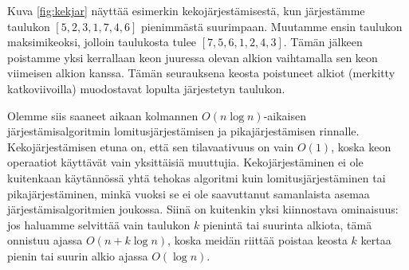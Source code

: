 Kuva \ref{fig:kekjar} näyttää esimerkin kekojärjestämisestä,
kun järjestämme taulukon $[5,2,3,1,7,4,6]$
pienimmästä suurimpaan.
Muutamme ensin taulukon maksimikeoksi,
jolloin taulukosta tulee $[7,5,6,1,2,4,3]$.
Tämän jälkeen poistamme yksi kerrallaan
keon juuressa olevan alkion vaihtamalla sen
keon viimeisen alkion kanssa.
Tämän seurauksena keosta poistuneet alkiot
(merkitty katkoviivoilla) muodostavat lopulta järjestetyn taulukon.

Olemme siis saaneet aikaan kolmannen $O(n \log n)$-aikaisen
järjestämis\-algoritmin lomitusjärjestämisen ja pikajärjestämisen rinnalle.
Kekojärjestä\-misen etuna on, että sen tilavaativuus on vain $O(1)$,
koska keon operaatiot käyttävät vain yksittäisiä muuttujia.
Kekojärjestäminen ei ole kuitenkaan käytännössä yhtä tehokas algoritmi
kuin lomitusjärjestäminen tai pikajärjestäminen,
minkä vuoksi se ei ole saavuttanut samanlaista asemaa
järjestämisalgoritmien joukossa.
Siinä on kuitenkin yksi kiinnostava ominaisuus:
jos haluamme selvittää vain taulukon $k$ pienintä tai suurinta
alkiota, tämä onnistuu ajassa $O(n+k \log n)$,
koska meidän riittää poistaa keosta $k$ kertaa
pienin tai suurin alkio ajassa $O(\log n)$.
